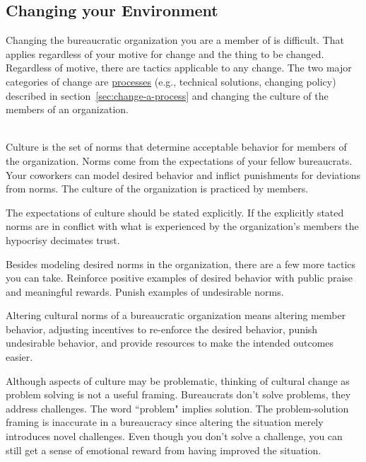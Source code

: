 \subsection*{Changing your Environment}


Changing the bureaucratic organization you are a member of is difficult. That applies regardless of your motive for change and the thing to be changed. Regardless of motive, there are tactics applicable to any change. 
The two major categories of change are 
\hyperref[sec:change-a-process]{processes} (e.g., technical solutions, changing policy)
\ifsectionref
described in section~\ref{sec:change-a-process} 
\fi
and changing the \gls{culture} of the members of an organization.

\ \\

Culture is the set of norms that determine acceptable behavior for members of the organization. Norms come from the expectations of your fellow bureaucrats. Your coworkers can model desired behavior and inflict punishments for deviations from norms. The culture of the organization is practiced by members. 

The expectations of culture should be stated explicitly. If the explicitly stated norms are in conflict with what is experienced by the organization's members the hypocrisy decimates trust. 

Besides modeling desired norms in the organization, there are a few more tactics you can take. 
Reinforce positive examples of desired behavior with public praise and meaningful rewards. Punish examples of undesirable norms. 

Altering cultural norms of a bureaucratic organization means altering member behavior, adjusting incentives to re-enforce the desired behavior, punish undesirable behavior, and provide resources to make the intended outcomes easier. 

Although aspects of culture may be problematic, thinking of cultural change as problem solving is not a useful framing. Bureaucrats don't solve problems, they address challenges. The word ``problem" implies solution. The problem-solution framing is inaccurate in a bureaucracy since altering the situation merely introduces novel challenges. 
Even though you don't solve a challenge, you can still get a sense of emotional reward from having improved the situation. 

